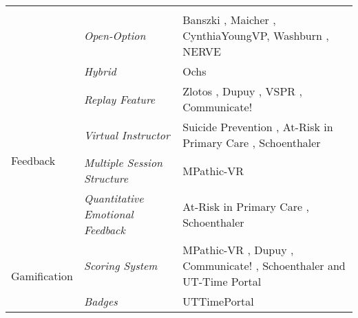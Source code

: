 \begin{table} [t]
{\begin{center}
\begin{tabular}{| p{1.8cm} | p{2cm} | p{8cm} |}
        \cite{hirumi2016advancingPart2,hirumi2016advancing,kleinsmith2015understanding}\\
    \cline{2-3}
        & \emph{Open-Option} & Banszki \cite{banszki2018clinical,quail2016student}, Maicher \cite{maicher2017developing}, CynthiaYoungVP\cite{foster2016using}, Washburn \cite{washburn2020virtual}, NERVE
        \cite{hirumi2016advancingPart2,hirumi2016advancing,kleinsmith2015understanding} \\
    \cline{2-3}
        & \emph{Hybrid} & Ochs \cite{ochs2019training}  \\
    \hline
        \multirow{4}{}{Feedback} & \emph{Replay Feature} & Zlotos \cite{zlotos2016scenario}, Dupuy \cite{dupuy2019virtual}, VSPR \cite{peddle2019exploring,peddle2019development}, Communicate! \cite{jeuring2015communicate}\\
    \cline{2-3}
        & \emph{Virtual Instructor} & Suicide Prevention \cite{o2019suicide}, At-Risk in Primary Care \cite{albright2018using}, Schoenthaler \cite{schoenthaler2017simulated}\\
    \cline{2-3}
        & \emph{Multiple Session Structure} & MPathic-VR \cite{guetterman2019medical,kron2017using}  \\
    \cline{2-3}
        & \emph{Quantitative Emotional Feedback} & At-Risk in Primary Care \cite{albright2018using}, Schoenthaler \cite{schoenthaler2017simulated}\\
    \hline
        \multirow{3}{}{Gamification} & \emph{Scoring System} & MPathic-VR \cite{guetterman2019medical,kron2017using}, Dupuy \cite{dupuy2019virtual}, Communicate! \cite{jeuring2015communicate}, Schoenthaler \cite{schoenthaler2017simulated} and UT-Time Portal \cite{zielke2016beyond,zielke2016using}\\
    \cline{2-3}
    & \emph{Badges} & UTTimePortal \cite{zielke2016beyond,zielke2016using}  \\
    \hline
     \end{tabular}
\end{center}
}
\end{table}
\normalsize



